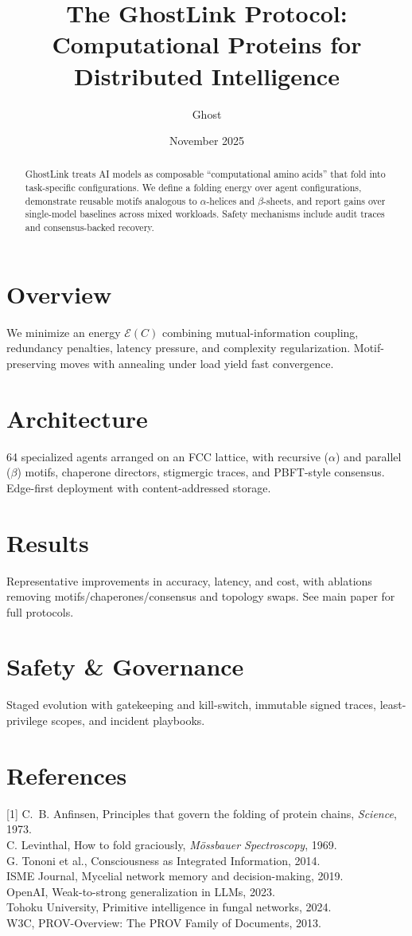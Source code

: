 \documentclass[11pt]{article}
\title{The GhostLink Protocol: Computational Proteins for Distributed Intelligence}
\author{Ghost}
\date{November 2025}
\begin{document}
\maketitle

\begin{abstract}
GhostLink treats AI models as composable ``computational amino acids'' that fold into task-specific configurations. We define a folding energy over agent configurations, demonstrate reusable motifs analogous to $\alpha$-helices and $\beta$-sheets, and report gains over single-model baselines across mixed workloads. Safety mechanisms include audit traces and consensus-backed recovery.
\end{abstract}

\section{Overview}
We minimize an energy $\mathcal{E}(C)$ combining mutual-information coupling, redundancy penalties, latency pressure, and complexity regularization. Motif-preserving moves with annealing under load yield fast convergence.

\section{Architecture}
64 specialized agents arranged on an FCC lattice, with recursive ($\alpha$) and parallel ($\beta$) motifs, chaperone directors, stigmergic traces, and PBFT-style consensus. Edge-first deployment with content-addressed storage.

\section{Results}
Representative improvements in accuracy, latency, and cost, with ablations removing motifs/chaperones/consensus and topology swaps. See main paper for full protocols.

\section{Safety \& Governance}
Staged evolution with gatekeeping and kill-switch, immutable signed traces, least-privilege scopes, and incident playbooks.

\section*{References}
{\small
[1] C.~B. Anfinsen, Principles that govern the folding of protein chains, \emph{Science}, 1973.\\
[2] C. Levinthal, How to fold graciously, \emph{M{\"o}ssbauer Spectroscopy}, 1969.\\
[3] G. Tononi et al., Consciousness as Integrated Information, 2014.\\
[4] ISME Journal, Mycelial network memory and decision-making, 2019.\\
[5] OpenAI, Weak-to-strong generalization in LLMs, 2023.\\
[6] Tohoku University, Primitive intelligence in fungal networks, 2024.\\
[7] W3C, PROV-Overview: The PROV Family of Documents, 2013.
}
\end{document}
